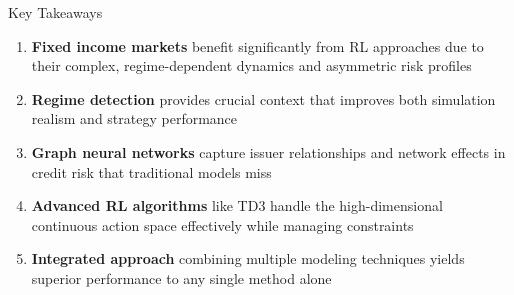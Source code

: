 \documentclass{beamer}
\begin{document}
    

\begin{frame}{Key Takeaways}
\begin{enumerate}
    \item \textbf{Fixed income markets} benefit significantly from RL approaches due to their complex, regime-dependent dynamics and asymmetric risk profiles
    
    \item \textbf{Regime detection} provides crucial context that improves both simulation realism and strategy performance
    
    \item \textbf{Graph neural networks} capture issuer relationships and network effects in credit risk that traditional models miss
    
    \item \textbf{Advanced RL algorithms} like TD3 handle the high-dimensional continuous action space effectively while managing constraints
    
    \item \textbf{Integrated approach} combining multiple modeling techniques yields superior performance to any single method alone
\end{enumerate}
\end{frame}
\end{document}
